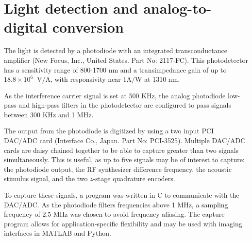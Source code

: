 \section{Light detection and analog-to-digital conversion}

The light is detected by a photodiode with an integrated transconductance amplifier (New Focus, Inc., United States. Part No: 2117-FC). This photodetector has a sensitivity range of 800-1700 nm and a transimpedance gain of up to $18.8 \times 10^6 \;\; \mathrm{V}/\mathrm{A}$, with responsivity near $1 \mathrm{A}/\mathrm{W}$ at 1310 nm. %

As the interference carrier signal is set at 500 KHz, the analog photodiode low-pass and high-pass filters in the photodetector are configured to pass signals between 300 KHz and 1 MHz.



The output from the photodiode is digitized by using a two input PCI DAC/ADC card (Interface Co., Japan. Part No: PCI-3525). Multiple DAC/ADC cards are daisy chained together to be able to capture greater than two signals simultaneously. This is useful, as up to five signals may be of interest to capture: the photodiode output, the RF synthesizer difference frequency, the acoustic stimulus signal, and the two $z$-stage quadrature encoders.


To capture these signals, a program was written in C to communicate with the DAC/ADC. As the photodiode filters frequencies above 1 MHz, a sampling frequency of 2.5 MHz was chosen to avoid frequency aliasing. The capture program allows for application-specific flexibility and may be used with imaging interfaces in MATLAB and Python.


